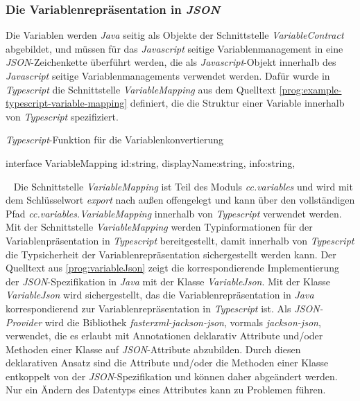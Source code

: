 \subsubsection{Die Variablenrepräsentation in \emph{JSON}}
Die Variablen werden \emph{Java} seitig als Objekte der Schnittstelle \emph{VariableContract} abgebildet, und müssen für das \emph{Javascript} seitige Variablenmanagement in eine \emph{JSON}-Zeichenkette überführt werden, die als \emph{Javascript}-Objekt innerhalb des \emph{Javascript} seitige Variablenmanagements verwendet werden. Dafür wurde in \emph{Typescript} die Schnittstelle \emph{VariableMapping} aus dem Quelltext \ref{prog:example-typescript-variable-mapping} definiert, die die Struktur einer Variable innerhalb von \emph{Typescript} spezifiziert.
\begin{program}[h]
\caption{\emph{Typescript}-Funktion für die Variablenkonvertierung}
\label{prog:example-typescript-variable-mapping}
\begin{JsCode}[numbers=none]
interface VariableMapping {    
	id:string,       
	displayName:string,        
	info:string,
}
\end{JsCode}
\end{program}
\ \newline
Die Schnittstelle \emph{VariableMapping} ist Teil des Moduls \emph{cc.variables} und wird mit dem Schlüsselwort \emph{export} nach außen offengelegt und kann über den vollständigen Pfad \emph{cc.variables.VariableMapping} innerhalb von \emph{Typescript} verwendet werden. Mit der Schnittstelle \emph{VariableMapping} werden Typinformationen für der Variablenpräsentation in \emph{Typescript} bereitgestellt, damit innerhalb von \emph{Typescript} die Typsicherheit der Variablenrepräsentation sichergestellt werden kann.
\newline
\newline
Der Quelltext aus \ref{prog:variableJson} zeigt die korrespondierende Implementierung der \emph{JSON}-Spezifikation in \emph{Java} mit der Klasse \emph{VariableJson}. Mit der Klasse \emph{VariableJson} wird sichergestellt, das die Variablenrepräsentation in \emph{Java} korrespondierend zur Variablenrepräsentation in \emph{Typescript} ist. Als \emph{JSON-Provider} wird die Bibliothek \emph{fasterxml-jackson-json}, vormals \emph{jackson-json}, verwendet, die es erlaubt mit Annotationen deklarativ Attribute und/oder Methoden einer Klasse auf \emph{JSON}-Attribute abzubilden. Durch diesen deklarativen Ansatz sind die Attribute und/oder die Methoden einer Klasse entkoppelt von der \emph{JSON}-Spezifikation und können daher abgeändert werden. Nur ein Ändern des Datentyps eines Attributes kann zu Problemen führen. 
